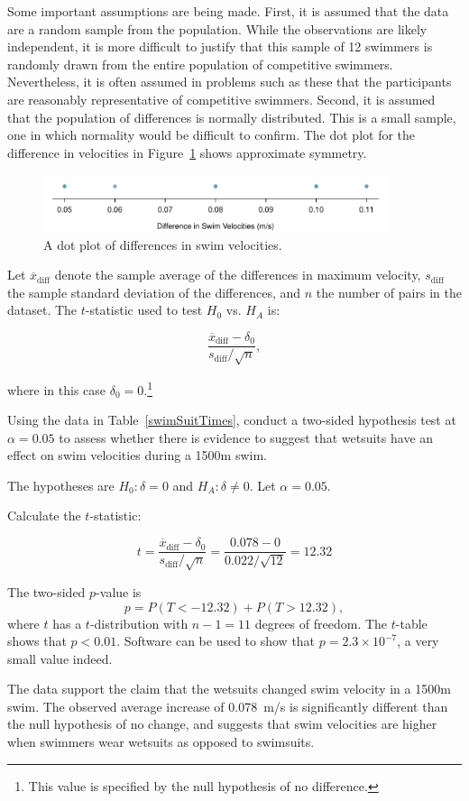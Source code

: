Some important assumptions are being made. First, it is assumed that the data are a random sample from the population. While the observations are likely independent, it is more difficult to justify that this sample of 12 swimmers is randomly drawn from the entire population of competitive swimmers. Nevertheless, it is often assumed in problems such as these that the participants are reasonably representative of competitive swimmers. Second, it is assumed that the population of differences is normally distributed. This is a small sample, one in which normality would be difficult to confirm. The dot plot for the difference in velocities in Figure~\ref{swimDotPlot} shows approximate symmetry.

\begin{figure}[h]
	\centering
	\includegraphics[width=0.9\textwidth]{ch_inference_for_means_oi_biostat/figures/swimDotPlot/swimDotPlot}
	\caption{A dot plot of differences in swim velocities.}
	\label{swimDotPlot}
\end{figure}

\newpage

Let $\overline{x}_{\text{diff}}$ denote the sample average of the differences in maximum velocity, $s_{\text{diff}}$ the sample standard deviation of the differences, and $n$ the number of pairs in the dataset. The $t$-statistic used to test $H_0$ vs. $H_A$ is: 

\[\frac{\overline{x}_{\text{diff}} - \delta_0} {s_{\text{diff}}/\sqrt{n}},\]

where in this case $\delta_0 = 0$.\footnote{This value is specified by the null hypothesis of no difference.}

\begin{example}{Using the data in Table~\ref{swimSuitTimes}, conduct a two-sided hypothesis test at $\alpha = 0.05$ to assess whether there is evidence to suggest that wetsuits have an effect on swim velocities during a 1500m swim.}

The hypotheses are $H_0: \delta = 0$ and $H_A: \delta \neq 0$. Let $\alpha = 0.05$. 

Calculate the $t$-statistic:

\[t = \frac{\overline{x}_{\text{diff}} - \delta_0} {s_{\text{diff}}/\sqrt{n}} = \frac{0.078 - 0}{0.022/\sqrt{12}} = 12.32\]

The two-sided $p$-value is
$$ p = P(T < -\text{12.32}) + P(T > \text{12.32}), $$
where $t$ has a $t$-distribution with $n-1 = 11$  degrees of freedom.
The $t$-table shows that $p < 0.01$. Software can be used to show that $p = 2.3 \times 10^{-7}$, a very small value indeed.  
	
The data support the claim that the wetsuits changed swim velocity in a 1500m swim. The observed average increase of 0.078~m/s is significantly different than the null hypothesis of no change, and suggests that swim velocities are higher when swimmers wear wetsuits as opposed to swimsuits.	

\end{example}

